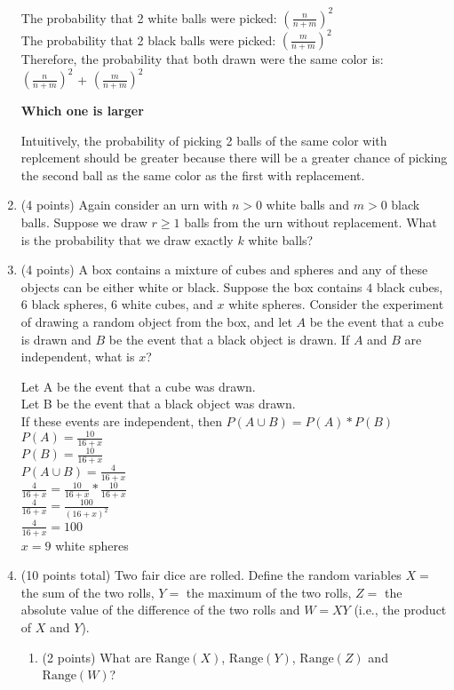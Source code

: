 \documentclass[11pt]{article}
\newcommand{\Range}{{\mathrm{Range}}}
\begin{document}
\begin{enumerate}
	The probability that 2 white balls were picked: $(\frac{n}{n+m})^{2}$ \\
	The probability that 2 black balls were picked: $(\frac{m}{n+m})^{2}$ \\
	Therefore, the probability that both drawn were the same color is: \\
	$(\frac{n}{n+m})^{2}$ + $(\frac{m}{n+m})^{2}$ 

{\bf Which one is larger}

	Intuitively, the probability of picking 2 balls of the same color with
	replcement should be greater because there will be a greater chance of 
	picking the second ball as the same color as the first with replacement.

\item (4 points) Again consider an urn with $n>0$ white balls and $m >0$ black
balls.  Suppose we draw $r\geq 1$ balls from the urn without replacement.  What
is the probability that we draw exactly $k$ white balls?

\item (4 points) A box contains a mixture of cubes and spheres and any of these
objects can be either white or black.  Suppose the box contains $4$ black
cubes, $6$ black spheres, $6$ white cubes, and $x$ white spheres.  Consider the
experiment of drawing a random object from the box, and let $A$ be the event
that a cube is drawn and $B$ be the event that a black object is drawn.
If $A$ and $B$ are independent, what is $x$?

	Let A be the event that a cube was drawn. \\
	Let B be the event that a black object was drawn. \\
	If these events are independent, then $P(A \cup B) = P(A) * P(B)$ \\
	$P(A) = \frac{10}{16+x}$ \\
	$P(B) = \frac{10}{16+x}$ \\
	$P(A \cup B) = \frac{4}{16+x}$ \\
	$\frac{4}{16+x} = \frac{10}{16+x} * \frac{10}{16+x}$ \\
	$\frac{4}{16+x} = \frac{100}{(16+x)^{2}}$ \\
	$\frac{4}{16+x} = 100$ \\
	$x = 9$ white spheres


\item (10 points total) Two fair dice are rolled.  Define the random variables
$X =$ the sum of the two rolls,
$Y =$ the maximum of the two rolls,
$Z =$ the absolute value of the difference of the two rolls
and $W = XY$ (i.e., the product of $X$ and $Y$).
\begin{enumerate}
 \item (2 points) What are $\Range(X)$, $\Range(Y)$, $\Range(Z)$ and
 $\Range(W)$?


\end{enumerate}
\end{enumerate}
\end{document}

